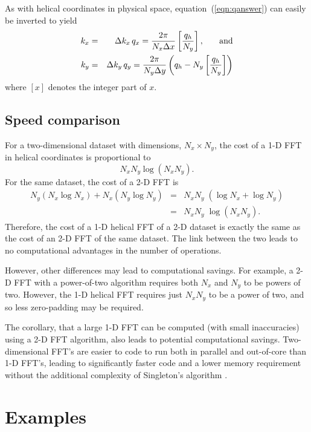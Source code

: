 \par
As with helical coordinates in physical space, 
equation~(\ref{eqn:qanswer}) can easily be inverted to yield
\begin{eqnarray}
k_x & = & \Delta k_x \, q_x = \frac{2 \pi}{N_x \Delta x} 
\left[ \frac{q_h}{N_y}\right], \hspace{0.25in} {\rm and} \\
k_y & = & \Delta k_y \, q_y = \frac{2 \pi}{N_y \Delta y}
\left(
q_h - N_y \left[ \frac{q_h}{N_y}\right]
\right)
\end{eqnarray}
where $[x]$ denotes the integer part of $x$. 

\subsection{Speed comparison}
For a two-dimensional dataset with dimensions, $N_x \times N_y$, the
cost of a 1-D FFT in helical coordinates is proportional to
\begin{equation}
N_x N_y \log \left( N_x N_y \right).
\end{equation}
For the same dataset, the cost of a 2-D FFT is 
\begin{eqnarray}
N_y \left( N_x \log N_x \right) + N_x \left( N_y \log N_y
\right)
& = & N_x N_y \; \left( \log N_x + \log N_y \right)  \nonumber \\
& = & N_x N_y \; \log \left( N_x N_y \right).
\end{eqnarray}
Therefore, the cost of a 1-D helical FFT of a 2-D dataset 
is exactly the same as the cost of an 2-D FFT of the same dataset.
The link between the two leads to no computational advantages in the
number of operations.

However, other differences may lead to computational savings.  For
example, a 2-D FFT with a power-of-two algorithm requires both $N_x$
and $N_y$ to be powers of two. However, the 1-D helical FFT requires
just $N_x N_y$ to be a power of two, and so less zero-padding may be
required.  

The corollary, that a large 1-D FFT 
can be computed (with small inaccuracies) using a 2-D FFT algorithm, 
also leads to potential computational savings.
Two-dimensional FFT's are easier to code to run both in parallel and
out-of-core than 1-D FFT's, leading to significantly faster code and a
lower memory requirement without the additional complexity of
Singleton's algorithm \cite[]{numrec}.

\section{Examples}

